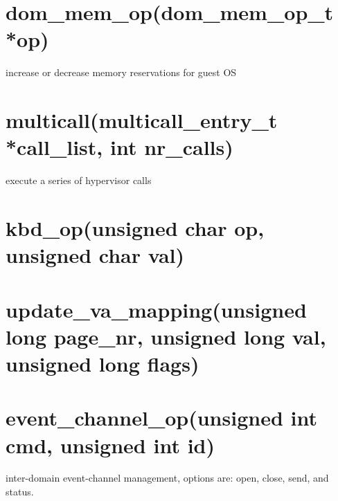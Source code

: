 \documentclass[11pt,twoside,final,openright]{xenstyle}
\begin{document}
\section{ dom\_mem\_op(dom\_mem\_op\_t *op)}
 increase or decrease memory reservations for guest OS

\section{ multicall(multicall\_entry\_t *call\_list, int nr\_calls)}
 execute a series of hypervisor calls

\section{ kbd\_op(unsigned char op, unsigned char val)}

\section{update\_va\_mapping(unsigned long page\_nr, unsigned long val, unsigned long flags)}

\section{ event\_channel\_op(unsigned int cmd, unsigned int id)} 
inter-domain event-channel management, options are: open, close, send, and status.
\end{document}
